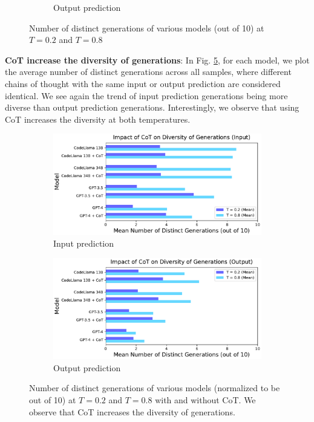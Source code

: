 \begin{figure}[H]
\begin{subfigure}[b]{0.49\textwidth}
         \caption{Output prediction}
         \label{fig:sample-diversity-direct-output}
     \end{subfigure}
     \caption{Number of distinct generations of various models (out of 10) at $T=0.2$ and $T=0.8$}
     \label{fig:sample-diversity-direct}
\end{figure}

\textbf{CoT increase the diversity of generations}: In Fig. \ref{fig:sample-diversity-cot}, for each model, we plot the average number of distinct generations across all samples, where different chains of thought with the same input or output prediction are considered identical.  We see again the trend of input prediction generations being more diverse than output prediction generations. Interestingly, we observe that using CoT increases the diversity at both temperatures. 

\begin{figure}[H]
     \centering
     \begin{subfigure}[b]{0.49\textwidth}
         \centering
         \includegraphics[width=\textwidth]{figs/diversity/diversity_freq_input_cot.pdf}
         \caption{Input prediction}
         \label{fig:sample-diversity-cot-input}
     \end{subfigure}
     \hfill
     \begin{subfigure}[b]{0.49\textwidth}
         \centering
         \includegraphics[width=\textwidth]{figs/diversity/diversity_freq_output_cot.pdf}
         \caption{Output prediction}
         \label{fig:sample-diversity-cot-output}
     \end{subfigure}
     \caption{Number of distinct generations of various models (normalized to be out of 10) at $T=0.2$ and $T=0.8$ with and without CoT. We observe that CoT increases the diversity of generations.}
     \label{fig:sample-diversity-cot}
\end{figure}

